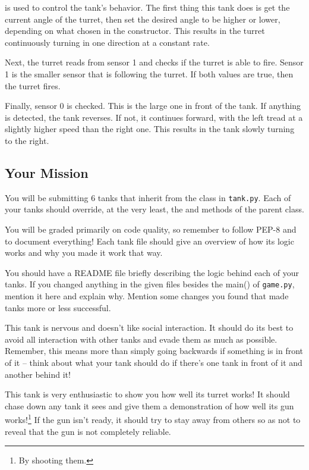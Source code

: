 \documentclass[11pt]{cselabheader}
\begin{document}
 is used to control the tank's behavior. The first thing this
tank does is get the current angle of the turret, then set the desired angle to
be higher or lower, depending on what chosen in the constructor. This results
in the turret continuously turning in one direction at a constant rate.

Next, the turret reads from sensor 1 and checks if the turret is able to fire.
Sensor 1 is the smaller sensor that is following the turret. If both values are
true, then the turret fires.

Finally, sensor 0 is checked. This is the large one in front of the tank. If
anything is detected, the tank reverses. If not, it continues forward, with the
left tread at a slightly higher speed than the right one. This results in the
tank slowly turning to the right.

\pagebreak
\subsection{Your Mission}
\label{subsec:ex}
You will be submitting 6 tanks that inherit from the  class
in \texttt{tank.py}. Each of your tanks should override, at the very least,
the  and  methods of
the parent class.

You will be graded primarily on code quality, so remember to follow PEP-8 and
to document everything! Each tank file should give an overview of how its logic
works and why you made it work that way.

\begin{ex}
You should have a README file briefly describing the logic behind each of your
tanks. If you changed anything in the given files besides the main() of
\texttt{game.py}, mention it here and explain why. Mention some changes you
found that made tanks more or less successful.
\end{ex}

\begin{ex}[coward.py]
This tank is nervous and doesn't like social interaction. It should do its best
to avoid all interaction with other tanks and evade them as much as possible.
Remember, this means more than simply going backwards if something is in front
of it -- think about what your tank should do if there's one tank in front of it
and another behind it!
\end{ex}

\begin{ex}[charger.py]
This tank is very enthusiastic to show you how well its turret works! It should
chase down any tank it sees and give them a demonstration of how well its gun
works!\footnote{By shooting them.} If the gun isn't ready, it should try to stay
away from others so as not to reveal that the gun is not completely reliable.
\end{ex}
\end{document}
